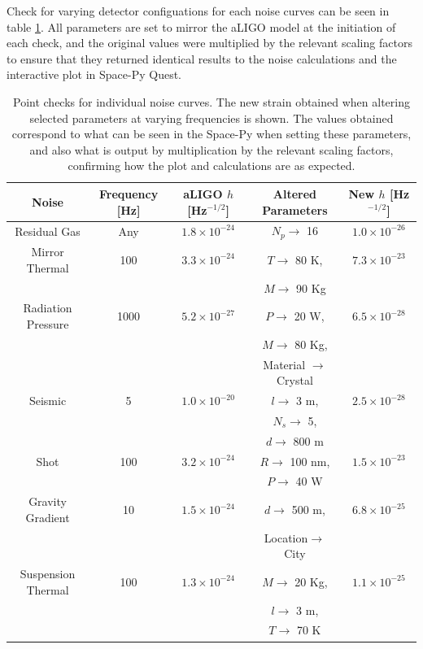 \documentclass{article}
\begin{document}
Check for varying detector configuations for each noise curves can be seen in table \ref{tab::checks}. All parameters are set to mirror the aLIGO model at the initiation of each check, and the original values were multiplied by the relevant scaling factors to ensure that they returned identical results to the noise calculations and the interactive plot in Space-Py Quest. 
 

     \begin{table}[h]
     \centering
     \captionsetup{width=0.9\textwidth}
      \caption{Point checks for individual noise curves. The new strain obtained when altering selected parameters at varying frequencies is shown. The values obtained correspond to what can be seen in the Space-Py when setting these parameters, and also what is output by multiplication by the relevant scaling factors, confirming how the plot and calculations are as expected.}
      \label{tab::checks}
    \begin{tabular}{ |c|c|c|c|c| }
     \hline
     \textbf{Noise} & \textbf{Frequency [Hz]} & \textbf{aLIGO} $h$ [Hz$^{-1/2}$] &\textbf{Altered Parameters}    & \textbf{New} $h$ [Hz$^{-1/2}$]  \\     \hline
     {Residual Gas}  & Any & $1.8 \times 10^{-24}$ & $N_p \rightarrow$ 16 & $1.0\times 10^{-26}$ \\ 
     \hline
     {Mirror Thermal}  & 100 & $3.3 \times 10^{-24}$ & $T \rightarrow$ 80 K, & $7.3\times 10^{-23}$\\
       &  &  & $M \rightarrow$ 90 Kg &  \\ 
     \hline
     {Radiation Pressure}  & 1000 &  $5.2\times 10^{-27}$ & $P \rightarrow$ 20 W, & $6.5\times 10^{-28}$\\ 
      &  &   & $M \rightarrow$ 80 Kg, &  \\ 
      &  &   & Material $\rightarrow$ Crystal &  \\ 
     \hline
     {Seismic}  & 5 & $1.0 \times 10^{-20}$ & $l\rightarrow$ 3 m,  & $2.5 \times 10^{-28}$  \\ 
      &  &  & $N_s\rightarrow$ 5,  &  \\ 
      &  &  & $d\rightarrow$ 800 m  &  \\ 
     \hline
     {Shot}  & 100 & $3.2 \times 10^{-24}$ & $R\rightarrow$ 100 nm,  & $1.5 \times 10^{-23}$ \\ 
     &  &  & $P\rightarrow$ 40 W  & \\ 
     \hline
    {Gravity Gradient}  & 10 & $1.5 \times 10^{-24}$ & $d\rightarrow$ 500 m,  & $6.8 \times 10^{-25}$ \\ 
    &  &  & Location$\rightarrow$ City  &  \\ 
    \hline
    {Suspension Thermal}  & 100 & $1.3 \times 10^{-24}$ & $M\rightarrow$ 20 Kg,  & $1.1 \times 10^{-25}$ \\  
    &  &  & $l\rightarrow$ 3 m,  &  \\ 
    &  &  & $T\rightarrow$ 70 K  &  \\ 
    \hline
    \end{tabular}
    \end{table}
\end{document}
